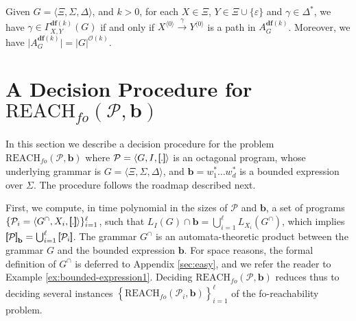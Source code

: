 \documentclass[final]{llncs}
\newcommand{\rbr}{{\bf ]\!\!]}}
\newcommand{\lbr}{{\bf [\!\![}}
\newcommand{\sem}[1]{\lbr #1 \rbr}
\newcommand{\arrow}[2]{\xrightarrow{{\scriptscriptstyle #1}}}
\def\set#1{{\left\{ #1 \right\}}}
\def\tuple#1{{\langle #1 \rangle}}
\def\len#1{{\vert{#1}\vert}}
\def\prod{\Delta}
\def\pat{{\mathbf{b}}}
\def\df#1{\scriptscriptstyle\mathbf{df}(#1)}
\def\Vars{\ensuremath{\Xi}}
\def\foreach{\mathrm{REACH}_{\mathit{fo}}}
\begin{document}
\begin{lemma}\label{fsa-dfk}
Given $G = \tuple{ \Vars, \Sigma, \prod }$, and $k > 0$, for each 
$X \in \Vars$, $Y \in \Vars \cup \{\varepsilon\}$ and $\gamma \in \prod^*$, we have
\(\gamma \in \Gamma_{X,Y}^{\df{k}}(G)\) if and only if \(X^{\tuple{0}} \arrow{\gamma}{} Y^{\tuple{0}}\)
is a path in \(A^{\df{k}}_G\). Moreover, we have \(\len{A^{\df{k}}_G} = \len{G}^{\mathcal{O}(k)}\).
\end{lemma}

\section{A Decision Procedure for \(\foreach(\mathcal{P},\pat)\)}
\label{sec:bounded-control-sets}

In this section we describe a decision procedure for the
problem \(\foreach(\mathcal{P},\pat)\) where \(\mathcal{P} = \tuple{G,
I, \sem{.}}\) is an octagonal program, whose underlying grammar
is \(G=\tuple{\Vars,\Sigma,\prod}\), and \(\pat=w_1^*\ldots w_d^*\) is
a bounded expression over \(\Sigma\). The procedure follows the
roadmap described next. 

First, we compute, in time polynomial in the sizes of
\(\mathcal{P}\) and \(\pat\), a set of programs
\(\{ \mathcal{P}_i=\tuple{G^\cap,X_i,\sem{.}} \}_{i=1}^\ell\), 
such that \(L_I(G) \cap \pat = \bigcup_{i=1}^{\ell} L_{X_i}(G^\cap)\),
which implies \(\sem{\mathcal{P}}_\pat
= \bigcup_{i=1}^\ell \sem{\mathcal{P}_i}\).  The grammar \(G^\cap\) is
an automata-theoretic product between the grammar \(G\) and the bounded expression \(\pat\). For space
reasons, the formal definition of \(G^\cap\) is deferred to
Appendix \ref{sec:easy}, and we refer the reader to
Example \ref{ex:bounded-expression1}. 
Deciding \(\foreach(\mathcal{P},\pat)\)
reduces thus to deciding several
instances \(\set{\foreach(\mathcal{P}_i,\pat)}_{i=1}^\ell\) of the
fo-reachability problem.
\end{document}
